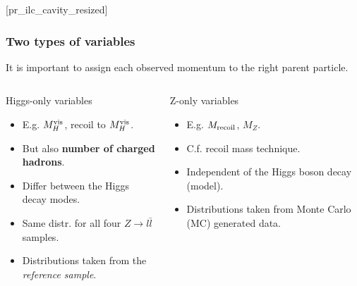 \setcounter{finalframe}{\value{framenumber}}

[pr_ilc_cavity_resized]

\begin{frame}
  \frametitle{Two types of variables}
  It is important to assign each observed momentum to the right parent particle.
  \begin{columns}[c,onlytextwidth]
  \begin{column}{0.5\textwidth}
  \begin{block}{Higgs-only variables}
  \begin{itemize}
    \item E.g. $M_H^{\textnormal{vis}}$, recoil to $M_H^{\textnormal{vis}}$.
    \item But also \textbf{number of charged hadrons}.
    \item Differ between the Higgs decay modes.
    \item Same distr. for all four $Z\rightarrow l \bar{l}$ samples.
    \item Distributions taken from the \textit{reference sample}.
  \end{itemize}
  \end{block}
  \end{column}
  \begin{column}{0.5\textwidth}
  \begin{block}{Z-only variables}
  \begin{itemize}
    \item E.g. $M_{\textnormal{recoil}}$, $M_Z$.
    \item C.f. recoil mass technique.
    \item Independent of the Higgs boson decay (model).
    \item Distributions taken from Monte Carlo (MC) generated data.
  \end{itemize}
  \end{block}
  \end{column}
  \end{columns}
  \end{frame}

